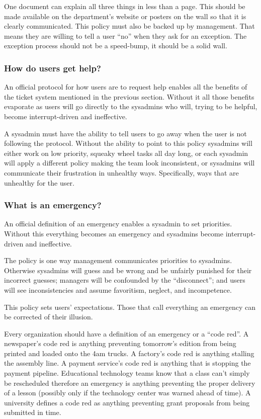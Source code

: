 \documentclass{article}
\begin{document}
One document can explain all three things in less than a page. This should be made available on the department's website or posters on the wall so that it is clearly communicated. This policy must also be backed up by management. That means they are willing to tell a user ``no'' when they ask for an exception. The exception process should not be a speed-bump, it should be a solid wall.

\subsubsection*{How do users get help?}
An official protocol for how users are to request help enables all the benefits of the ticket system mentioned in the previous section. Without it all those benefits evaporate as users will go directly to the sysadmins who will, trying to be helpful, become interrupt-driven and ineffective.

A sysadmin must have the ability to tell users to go away when the user is not following the protocol. Without the ability to point to this policy sysadmins will either work on low priority, squeaky wheel tasks all day long, or each sysadmin will apply a different policy making the team look inconsistent, or sysadmins will communicate their frustration in unhealthy ways. Specifically, ways that are unhealthy for the user.

\subsubsection*{What is an emergency?}
An official definition of an emergency enables a sysadmin to set priorities. Without this everything becomes an emergency and sysadmins become interrupt-driven and ineffective.

The policy is one way management communicates priorities to sysadmins. Otherwise sysadmins will guess and be wrong and be unfairly punished for their incorrect guesses; managers will be confounded by the ``disconnect''; and users will see inconsistencies and assume favoritism, neglect, and incompetence.

This policy sets users' expectations. Those that call everything an emergency can be corrected of their illusion.

Every organization should have a definition of an emergency or a ``code red''. A newspaper's code red is anything preventing tomorrow's edition from being printed and loaded onto the 4am trucks. A factory's code red is anything stalling the assembly line. A payment service's code red is anything that is stopping the payment pipeline. Educational technology teams know that a class can't simply be rescheduled therefore an emergency is anything preventing the proper delivery of a lesson (possibly only if the technology center was warned ahead of time). A university defines a code red as anything preventing grant proposals from being submitted in time.
\end{document}
